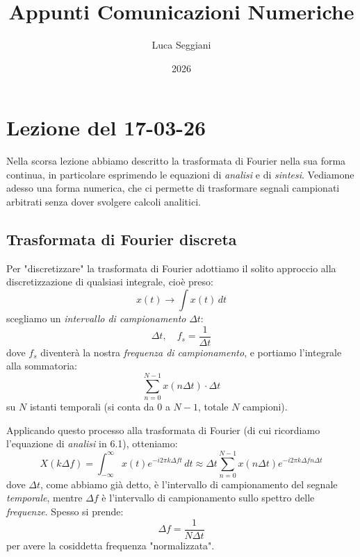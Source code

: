 \documentclass[a4paper,11pt]{article}
\title{Appunti Comunicazioni Numeriche}
\author{Luca Seggiani}
\date{2026}
\begin{document}
\section{Lezione del 17-03-26}

\thispagestyle{empty}
\pagestyle{fancy}

Nella scorsa lezione abbiamo descritto la trasformata di Fourier nella sua forma continua, in particolare esprimendo le equazioni di \textit{analisi} e di \textit{sintesi}. Vediamone adesso una forma numerica, che ci permette di trasformare segnali campionati arbitrati senza dover svolgere calcoli analitici.

\subsection{Trasformata di Fourier discreta}
Per "discretizzare" la trasformata di Fourier adottiamo il solito approccio alla discretizzazione di qualsiasi integrale, cioè preso:
$$
x(t) \rightarrow \int x(t) \, dt
$$
scegliamo un \textit{intervallo di campionamento} $\Delta t$:
$$
\Delta t, \quad f_s = \frac{1}{\Delta t}
$$
dove $f_s$ diventerà la nostra \textit{frequenza di campionamento}, e portiamo l'integrale alla sommatoria:
$$
\sum_{n=0}^{N - 1} x(n \Delta t) \cdot \Delta t
$$
su $N$ istanti temporali (si conta da $0$ a $N - 1$, totale $N$ campioni).

Applicando questo processo alla trasformata di Fourier (di cui ricordiamo l'equazione di \textit{analisi} in 6.1), otteniamo:
$$
X(k \Delta f) = \int_{-\infty}^{\infty} x(t) e^{-i 2 \pi k \Delta f t} \, dt \approx
\Delta t \sum_{n = 0}^{N - 1} x(n \Delta t) e^{- i 2 \pi k \Delta f n \Delta t}
$$
dove $\Delta t$, come abbiamo già detto, è l'intervallo di campionamento del segnale \textit{temporale}, mentre $\Delta f$ è l'intervallo di campionamento sullo spettro delle \textit{frequenze}. Spesso si prende:
$$
\Delta f = \frac{1}{N \Delta t}
$$
per avere la cosiddetta frequenza "normalizzata".
\end{document}
